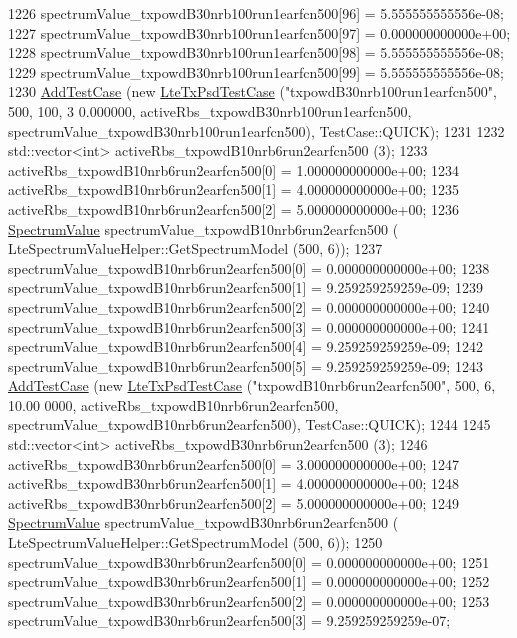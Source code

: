 \begin{DoxyCode}
1226   spectrumValue\_txpowdB30nrb100run1earfcn500[96] = 5.555555555556e-08;
1227   spectrumValue\_txpowdB30nrb100run1earfcn500[97] = 0.000000000000e+00;
1228   spectrumValue\_txpowdB30nrb100run1earfcn500[98] = 5.555555555556e-08;
1229   spectrumValue\_txpowdB30nrb100run1earfcn500[99] = 5.555555555556e-08;
1230   \hyperlink{classns3_1_1TestCase_a3718088e3eefd5d6454569d2e0ddd835}{AddTestCase} (\textcolor{keyword}{new} \hyperlink{classLteTxPsdTestCase}{LteTxPsdTestCase} (\textcolor{stringliteral}{"txpowdB30nrb100run1earfcn500"}, 500, 100, 3
      0.000000, activeRbs\_txpowdB30nrb100run1earfcn500, spectrumValue\_txpowdB30nrb100run1earfcn500), 
      TestCase::QUICK);
1231 
1232   std::vector<int> activeRbs\_txpowdB10nrb6run2earfcn500 (3);
1233   activeRbs\_txpowdB10nrb6run2earfcn500[0] = 1.000000000000e+00;
1234   activeRbs\_txpowdB10nrb6run2earfcn500[1] = 4.000000000000e+00;
1235   activeRbs\_txpowdB10nrb6run2earfcn500[2] = 5.000000000000e+00;
1236   \hyperlink{classns3_1_1SpectrumValue}{SpectrumValue} spectrumValue\_txpowdB10nrb6run2earfcn500 (
      LteSpectrumValueHelper::GetSpectrumModel (500, 6));
1237   spectrumValue\_txpowdB10nrb6run2earfcn500[0] = 0.000000000000e+00;
1238   spectrumValue\_txpowdB10nrb6run2earfcn500[1] = 9.259259259259e-09;
1239   spectrumValue\_txpowdB10nrb6run2earfcn500[2] = 0.000000000000e+00;
1240   spectrumValue\_txpowdB10nrb6run2earfcn500[3] = 0.000000000000e+00;
1241   spectrumValue\_txpowdB10nrb6run2earfcn500[4] = 9.259259259259e-09;
1242   spectrumValue\_txpowdB10nrb6run2earfcn500[5] = 9.259259259259e-09;
1243   \hyperlink{classns3_1_1TestCase_a3718088e3eefd5d6454569d2e0ddd835}{AddTestCase} (\textcolor{keyword}{new} \hyperlink{classLteTxPsdTestCase}{LteTxPsdTestCase} (\textcolor{stringliteral}{"txpowdB10nrb6run2earfcn500"}, 500, 6, 10.00
      0000, activeRbs\_txpowdB10nrb6run2earfcn500, spectrumValue\_txpowdB10nrb6run2earfcn500), TestCase::QUICK);
1244 
1245   std::vector<int> activeRbs\_txpowdB30nrb6run2earfcn500 (3);
1246   activeRbs\_txpowdB30nrb6run2earfcn500[0] = 3.000000000000e+00;
1247   activeRbs\_txpowdB30nrb6run2earfcn500[1] = 4.000000000000e+00;
1248   activeRbs\_txpowdB30nrb6run2earfcn500[2] = 5.000000000000e+00;
1249   \hyperlink{classns3_1_1SpectrumValue}{SpectrumValue} spectrumValue\_txpowdB30nrb6run2earfcn500 (
      LteSpectrumValueHelper::GetSpectrumModel (500, 6));
1250   spectrumValue\_txpowdB30nrb6run2earfcn500[0] = 0.000000000000e+00;
1251   spectrumValue\_txpowdB30nrb6run2earfcn500[1] = 0.000000000000e+00;
1252   spectrumValue\_txpowdB30nrb6run2earfcn500[2] = 0.000000000000e+00;
1253   spectrumValue\_txpowdB30nrb6run2earfcn500[3] = 9.259259259259e-07;

\end{DoxyCode}
